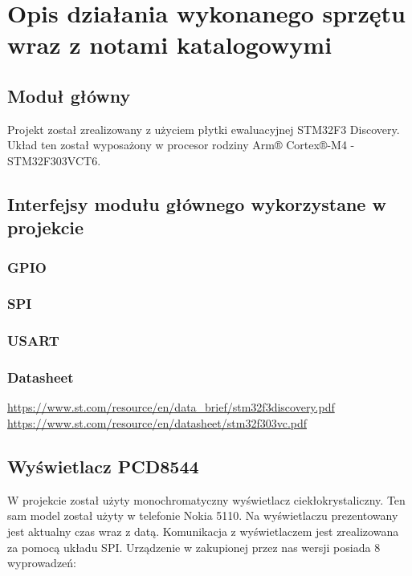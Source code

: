\documentclass{article}
\begin{document}

\section{Opis działania wykonanego sprzętu wraz z notami katalogowymi}

\subsection{Moduł główny}
Projekt został zrealizowany z użyciem płytki ewaluacyjnej STM32F3 Discovery.
Układ ten został wyposażony w procesor rodziny Arm® Cortex®-M4 - STM32F303VCT6.

\subsection{Interfejsy modułu głównego wykorzystane w projekcie}
\subsubsection{GPIO}
\subsubsection{SPI}
\subsubsection{USART}

\subsubsection{Datasheet}
\url{https://www.st.com/resource/en/data_brief/stm32f3discovery.pdf}
\newline
\url{https://www.st.com/resource/en/datasheet/stm32f303vc.pdf}

\subsection{Wyświetlacz PCD8544}

W projekcie został użyty monochromatyczny wyświetlacz ciekłokrystaliczny. Ten sam model
został użyty w telefonie Nokia 5110. Na wyświetlaczu prezentowany jest aktualny czas wraz z datą.
Komunikacja z wyświetlaczem jest zrealizowana za pomocą układu SPI.
Urządzenie w zakupionej przez nas wersji posiada 8 wyprowadzeń:
\end{document}
